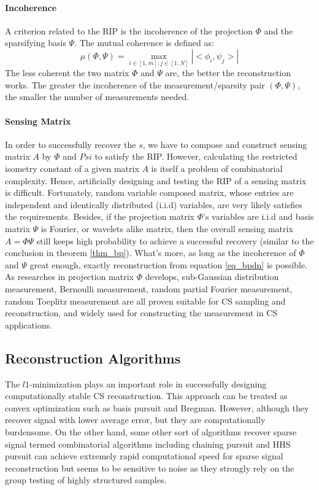 \paragraph{Incoherence}
A criterion related to the RIP is the incoherence of the projection $\Phi$ and the sparsifying basis $\Psi$. The mutual coherence is defined as:  
\begin{equation}
\label{cs_coherent}
\mu (\Phi, \Psi) = \max_{i \in [1,m]; j \in [1,N]} | < \phi_i, \psi_j > | 
\end{equation} 
The less coherent the two matrix $\Phi$ and $\Psi$ are, the better the reconstruction works. The greater the incoherence of the measurement/sparsity pair $(\Phi, \Psi)$, the smaller the number of measurements needed.

\paragraph{Sensing Matrix}
In order to successfully recover the $s$, we have to compose and construct sensing matrix $A$ by $\Phi$ and $Psi$ to satisfy the RIP. However, calculating the restricted isometry constant of a given matrix $A$ is itself a problem of combinatorial complexity. Hence, artificially designing and testing the RIP of a sensing matrix is difficult. Fortunately, random variable composed matrix, whose entries are independent and identically distributed (i.i.d) variables, are very likely satisfies the requirements\cite{rauhut2010compressive}. Besides, if the projection matrix $\Phi$'s variables are i.i.d and basis matrix $\Psi$ is Fourier, or wavelets alike matrix, then the overall sensing matrix $A = \Phi \Psi$ still keeps high probability to achieve a successful recovery (similar to the conclusion in theorem \ref{thm_bp}). What's more, as long as the incoherence of $\Phi$ and $\Psi$ great enough, exactly reconstruction from equation \ref{eq_bpdn} is possible. As researches in projection matrix $\Phi$ develops, sub-Gaussian distribution measurement, Bernoulli measurement, random partial Fourier measurement, random Toeplitz measurement\cite{bajwa2007toeplitz} are all proven suitable for CS sampling and reconstruction, and widely used for constructing the measurement in CS applications. 
 
\subsection{Reconstruction Algorithms}
\indent \indent The $l1$-minimization plays an important role in successfully designing computationally stable CS reconstruction. This approach can be treated as convex optimization such as basis pursuit\cite{chen1998atomic} and Bregman\cite{yin2008bregman}. However, although they recover signal with lower average error, but they are computationally burdensome. On the other hand, some other sort of algorithms recover sparse signal termed combinatorial algorithms including chaining pursuit\cite{gilbert2006algorithmic} and HHS pursuit\cite{gilbert2007one} can achieve extremely rapid computational speed for sparse signal reconstruction but seems to be sensitive to noise as they strongly rely on the group testing of highly structured samples.
 

